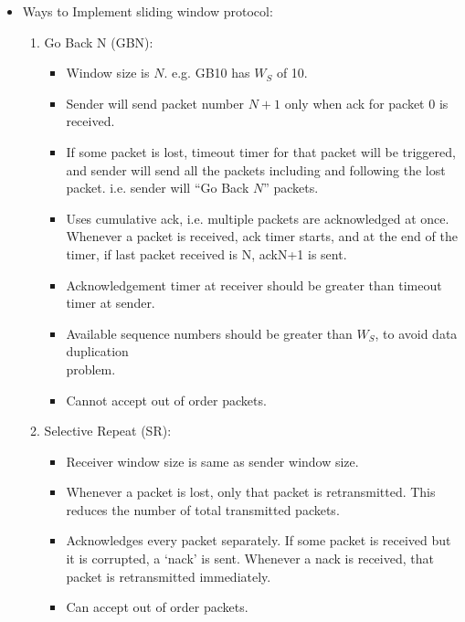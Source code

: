 \documentclass{article}
\begin{document}
\begin{itemize}
	\item Ways to Implement sliding window protocol:\begin{enumerate}
		\item Go Back N (GBN): \begin{itemize}
			\item Window size is $N$. e.g. GB10 has $W_S$ of 10.
			\item Sender will send packet number $N+1$ only when ack for packet 0 is received.
			\item If some packet is lost, timeout timer for that packet will be triggered, and sender will send all the packets including and following the lost packet. i.e. sender will ``Go Back $N$'' packets.
			\item Uses cumulative ack, i.e. multiple packets are acknowledged at once. Whenever a packet is received, ack timer starts, and at the end of the timer, if last packet received is N, ackN+1 is sent.
			\item Acknowledgement timer at receiver should be greater than timeout timer at sender.
			\item Available sequence numbers should be greater than $W_S$, to avoid data duplication \\problem.
			\item Cannot accept out of order packets.
		\end{itemize}
		\item Selective Repeat (SR):\begin{itemize}
			\item Receiver window size is same as sender window size.
			\item Whenever a packet is lost, only that packet is retransmitted. This reduces the number of total transmitted packets.
			\item Acknowledges every packet separately. If some packet is received but it is corrupted, a `nack' is sent. Whenever a nack is received, that packet is retransmitted immediately.
			\item Can accept out of order packets.
		\end{itemize}
	\end{enumerate}
\end{itemize}
\end{document}
